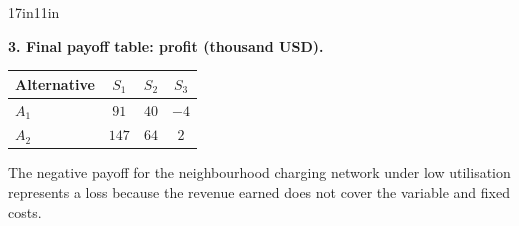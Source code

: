 \begin{CalculationLandscape}{17in}{11in}

\noindent\begin{minipage}{\linewidth}
\textbf{3. Final payoff table: profit (thousand USD).}
\begin{center}
\begin{tabular}{@{}lccc@{}}
\toprule
Alternative & \(S_1\) & \(S_2\) & \(S_3\) \\
\midrule
\(A_1\) & \(91\) & \(40\) & \(-4\) \\
\(A_2\) & \(147\) & \(64\) & \(2\) \\
\bottomrule
\end{tabular}
\end{center}
\end{minipage}


	The negative payoff for the neighbourhood charging network under low
	utilisation represents a loss because the revenue earned does not cover the
	variable and fixed costs.


\end{CalculationLandscape}



